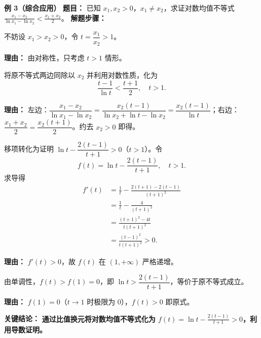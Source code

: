 \begin{examplebox}
	\medskip
	\textbf{\textcolor{CExample}{例 3（综合应用）}}
	\textbf{\textcolor{CExample}{题目：}}
	已知 $x_1,x_2>0$，$x_1\neq x_2$，求证对数均值不等式 $\displaystyle\frac{x_1-x_2}{\ln x_1-\ln x_2}<\frac{x_1+x_2}{2}$。
	\textbf{\textcolor{CExample}{解题步骤：}}
	\begin{description}[style=nextline, leftmargin=2.8em, labelsep=0.5em, itemsep=0.45em]
		\item[\textbf{第一步（比值换元）：}]
			不妨设 $x_1>x_2>0$，令 $t=\dfrac{x_1}{x_2}>1$。
			\par\textbf{理由：} 由对称性，只考虑 $t>1$ 情形。
		\item[\textbf{第二步（化为单变量不等式）：}]
			将原不等式两边同除以 $x_2$ 并利用对数性质，化为
			\[
				\frac{t-1}{\ln t} < \frac{t+1}{2},\quad t>1\text{.}
			\]
			\par\textbf{理由：} 左边：$\dfrac{x_1-x_2}{\ln x_1-\ln x_2}=\dfrac{x_2(t-1)}{\ln x_2 + \ln t - \ln x_2}=\dfrac{x_2(t-1)}{\ln t}$；右边：$\dfrac{x_1+x_2}{2}=\dfrac{x_2(t+1)}{2}$。约去 $x_2>0$ 即得。
		\item[\textbf{第三步（构造函数求导）：}]
			移项转化为证明 $\ln t - \dfrac{2(t-1)}{t+1}>0$（$t>1$）。令
			\[
				f(t)=\ln t - \frac{2(t-1)}{t+1},\quad t>1\text{.}
			\]
			求导得
			\[
				\begin{aligned}
					f'(t) &=\frac{1}{t} - \frac{2(t+1)-2(t-1)}{(t+1)^2} \\ &=\frac{1}{t} - \frac{4}{(t+1)^2} \\ &=\frac{(t+1)^2-4t}{t(t+1)^2} \\ &=\frac{(t-1)^2}{t(t+1)^2}>0\text{.}
			\end{aligned}
			\]
			\par\textbf{理由：} $f'(t)>0$，故 $f(t)$ 在 $(1,+\infty)$ 严格递增。
		\item[\textbf{第四步（回代结论）：}]
			由单调性，$f(t)>f(1)=0$，即 $\ln t > \dfrac{2(t-1)}{t+1}$，等价于原不等式成立。
			\par\textbf{理由：} $f(1)=0$（$t\to1$ 时极限为 $0$），$f(t)>0$ 即原式。
	\end{description}
	\textbf{\textcolor{CExample}{关键结论：}}
	\textbf{通过比值换元将对数均值不等式化为 $f(t)=\ln t - \frac{2(t-1)}{t+1}>0$，利用导数证明。}
\end{examplebox}
